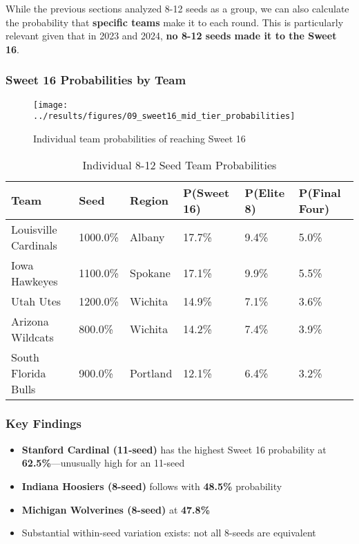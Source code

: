 \documentclass[
]{article}
\providecommand{\tightlist}{%
  \setlength{\itemsep}{0pt}\setlength{\parskip}{0pt}}
\begin{document}
While the previous sections analyzed 8-12 seeds as a group, we can also
calculate the probability that \textbf{specific teams} make it to each
round. This is particularly relevant given that in 2023 and 2024,
\textbf{no 8-12 seeds made it to the Sweet 16}.

\subsubsection{Sweet 16 Probabilities by
Team}\label{sweet-16-probabilities-by-team}

\begin{figure}

{\centering \texttt{[image: ../results/figures/09\_sweet16\_mid\_tier\_probabilities]} 

}

\caption{Individual team probabilities of reaching Sweet 16}\label{fig:sweet16-individual-plot}
\end{figure}

\begin{longtable}[t]{llllll}
\caption{\label{tab:sweet16-team-table}Individual 8-12 Seed Team Probabilities}\\
\toprule
Team & Seed & Region & P(Sweet 16) & P(Elite 8) & P(Final Four)\\
\midrule
Louisville Cardinals & 1000.0\% & Albany & 17.7\% & 9.4\% & 5.0\%\\
Iowa Hawkeyes & 1100.0\% & Spokane & 17.1\% & 9.9\% & 5.5\%\\
Utah Utes & 1200.0\% & Wichita & 14.9\% & 7.1\% & 3.6\%\\
Arizona Wildcats & 800.0\% & Wichita & 14.2\% & 7.4\% & 3.9\%\\
South Florida Bulls & 900.0\% & Portland & 12.1\% & 6.4\% & 3.2\%\\
\bottomrule
\end{longtable}

\subsubsection{Key Findings}\label{key-findings}

\begin{itemize}
\tightlist
\item
  \textbf{Stanford Cardinal (11-seed)} has the highest Sweet 16
  probability at \textbf{62.5\%}---unusually high for an 11-seed
\item
  \textbf{Indiana Hoosiers (8-seed)} follows with \textbf{48.5\%}
  probability
\item
  \textbf{Michigan Wolverines (8-seed)} at \textbf{47.8\%}
\item
  Substantial within-seed variation exists: not all 8-seeds are
  equivalent
\end{itemize}
\end{document}
